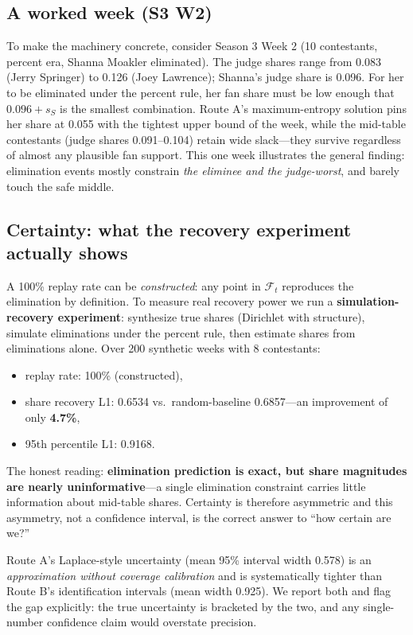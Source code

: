 \documentclass[12pt]{article}
\begin{document}
\subsection{A worked week (S3 W2)}
To make the machinery concrete, consider Season 3 Week 2 (10 contestants, percent
era, Shanna Moakler eliminated). The judge shares range from 0.083 (Jerry Springer)
to 0.126 (Joey Lawrence); Shanna's judge share is 0.096. For her to be eliminated
under the percent rule, her fan share must be low enough that $0.096 + s_S$ is the
smallest combination. Route A's maximum-entropy solution pins her share at 0.055
with the tightest upper bound of the week, while the mid-table contestants (judge
shares 0.091--0.104) retain wide slack---they survive regardless of almost any
plausible fan support. This one week illustrates the general finding: elimination
events mostly constrain \emph{the eliminee and the judge-worst}, and barely touch
the safe middle.

\subsection{Certainty: what the recovery experiment actually shows}
A 100\% replay rate can be \emph{constructed}: any point in $\mathcal{F}_t$ reproduces
the elimination by definition. To measure real recovery power we run a
\textbf{simulation-recovery experiment}: synthesize true shares (Dirichlet with
structure), simulate eliminations under the percent rule, then estimate shares from
eliminations alone. Over 200 synthetic weeks with 8 contestants:
\begin{itemize}
\item replay rate: 100\% (constructed),
\item share recovery L1: 0.6534 vs.\ random-baseline 0.6857---an improvement of only
\textbf{4.7\%},
\item 95th percentile L1: 0.9168.
\end{itemize}
The honest reading: \textbf{elimination prediction is exact, but share magnitudes
are nearly uninformative}---a single elimination constraint carries little
information about mid-table shares. Certainty is therefore asymmetric and this
asymmetry, not a confidence interval, is the correct answer to ``how certain are
we?''

Route A's Laplace-style uncertainty (mean 95\% interval width 0.578) is an
\emph{approximation without coverage calibration} and is systematically tighter
than Route B's identification intervals (mean width 0.925). We report both and
flag the gap explicitly: the true uncertainty is bracketed by the two, and any
single-number confidence claim would overstate precision.
\end{document}
